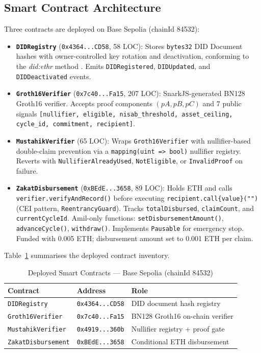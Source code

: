 \documentclass[conference]{IEEEtran}
\begin{document}
\subsection{Smart Contract Architecture}

Three contracts are deployed on Base Sepolia (chainId 84532):

\begin{itemize}
    \item \textbf{\texttt{DIDRegistry}} (\texttt{0x4364...CD58}, 58 LOC): Stores \texttt{bytes32} DID Document hashes with owner-controlled key rotation and deactivation, conforming to the \textit{did:ethr} method \cite{sporny2022did}. Emits \texttt{DIDRegistered}, \texttt{DIDUpdated}, and \texttt{DIDDeactivated} events.

    \item \textbf{\texttt{Groth16Verifier}} (\texttt{0x7c40...Fa15}, 207 LOC): SnarkJS-generated BN128 Groth16 verifier. Accepts proof components $(pA, pB, pC)$ and 7 public signals \texttt{[nullifier, eligible, nisab\_threshold, asset\_ceiling, cycle\_id, commitment, recipient]}.

    \item \textbf{\texttt{MustahikVerifier}} (65 LOC): Wraps \texttt{Groth16Verifier} with nullifier-based double-claim prevention via a \texttt{mapping(uint => bool)} nullifier registry. Reverts with \texttt{NullifierAlreadyUsed}, \texttt{NotEligible}, or \texttt{InvalidProof} on failure.

    \item \textbf{\texttt{ZakatDisbursement}} (\texttt{0xBEdE...3658}, 89 LOC): Holds ETH and calls \texttt{verifier.verifyAndRecord()} before executing \texttt{recipient.call\{value\}("")} (CEI pattern, \texttt{ReentrancyGuard}). Tracks \texttt{totalDisbursed}, \texttt{claimCount}, and \texttt{currentCycleId}. Amil-only functions: \texttt{setDisbursementAmount()}, \texttt{advanceCycle()}, \texttt{withdraw()}. Implements \texttt{Pausable} for emergency stop. Funded with 0.005 ETH; disbursement amount set to 0.001 ETH per claim.
\end{itemize}

Table~\ref{tab:contracts} summarises the deployed contract inventory.

\begin{table}[h]
\caption{Deployed Smart Contracts — Base Sepolia (chainId 84532)}
\label{tab:contracts}
\centering
\begin{tabularx}{\columnwidth}{p{2.1cm} p{2.6cm} X}
\toprule
\textbf{Contract} & \textbf{Address} & \textbf{Role} \\
\midrule
\texttt{DIDRegistry}       & \texttt{0x4364...CD58} & DID document hash registry \\
\texttt{Groth16Verifier}   & \texttt{0x7c40...Fa15}  & BN128 Groth16 on-chain verifier \\
\texttt{MustahikVerifier}  & \texttt{0x4919...360b} & Nullifier registry + proof gate \\
\texttt{ZakatDisbursement} & \texttt{0xBEdE...3658} & Conditional ETH disbursement \\
\bottomrule
\end{tabularx}
\end{table}
\end{document}
